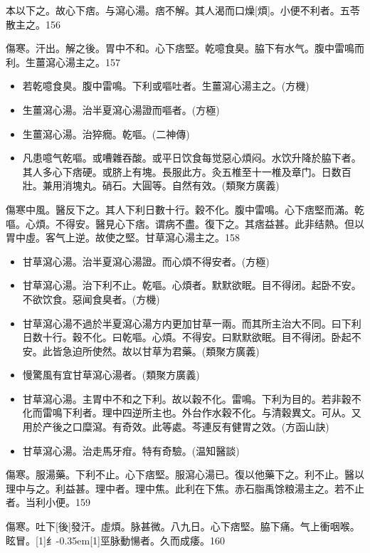 \documentclass[oneside,b4paper]{ctexbook}
\begin{document}
\begin{flushleft}
本以下之。故心下痞。与瀉心湯。痞不解。其人渴而口燥[煩]。小便不利者。五苓散主之。156

傷寒。汗出。解之後。胃中不和。心下痞堅。乾噫食臭。脇下有水气。腹中雷鳴而利。生薑瀉心湯主之。157

\begin{itemize}
\item 若乾噫食臭。腹中雷鳴。下利或嘔吐者。生薑瀉心湯主之。(方機)
\item 生薑瀉心湯。治半夏瀉心湯證而嘔者。(方極)
\item 生薑瀉心湯。治猝癇。乾嘔。(二神傳)
\item 凡患噫气乾嘔。或嘈雜吞酸。或平日饮食每觉惡心煩闷。水饮升降於脇下者。其人多心下痞硬。或脐上有塊。長服此方。灸五椎至十一椎及章门。日数百壯。兼用消塊丸。硝石。大圓等。自然有效。(類聚方廣義)
\end{itemize}

傷寒中風。醫反下之。其人下利日數十行。穀不化。腹中雷鳴。心下痞堅而滿。乾嘔。心煩。不得安。醫見心下痞。谓病不盡。復下之。其痞益甚。此非结熱。但以胃中虛。客气上逆。故使之堅。甘草瀉心湯主之。158

\begin{itemize}
\item 甘草瀉心湯。治半夏瀉心湯證。而心煩不得安者。(方極)
\item 甘草瀉心湯。治下利不止。乾嘔。心煩者。默默欲眠。目不得闭。起卧不安。不欲饮食。惡闻食臭者。(方機)
\item 甘草瀉心湯不過於半夏瀉心湯方内更加甘草一兩。而其所主治大不同。曰下利日数十行。穀不化。曰乾嘔。心煩。不得安。曰默默欲眠。目不得闭。卧起不安。此皆急迫所使然。故以甘草为君藥。(類聚方廣義)
\item 慢驚風有宜甘草瀉心湯者。(類聚方廣義)
\item 甘草瀉心湯。主胃中不和之下利。故以穀不化。雷鳴。下利为目的。若非穀不化而雷鳴下利者。理中四逆所主也。外台作水穀不化。与清穀異文。可从。又用於产後之口糜瀉。有奇效。此等處。芩連反有健胃之效。(方函山訣)
\item 甘草瀉心湯。治走馬牙疳。特有奇驗。(温知醫談)
\end{itemize}

傷寒。服湯藥。下利不止。心下痞堅。服瀉心湯已。復以他藥下之。利不止。醫以理中与之。利益甚。理中者。理中焦。此利在下焦。赤石脂禹馀粮湯主之。若不止者。当利小便。159

傷寒。吐下[後]發汗。虛煩。脉甚微。八九日。心下痞堅。脇下痛。气上衝咽喉。眩冒。{\hbox{\scalebox{0.68}[1]{纟}\kern-0.35em\scalebox{0.64}[1]{巠}}}脉動愓者。久而成痿。160


\end{flushleft}
\end{document}
